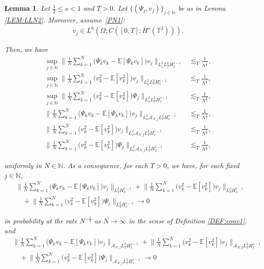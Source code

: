 \documentclass[letterpaper, 11pt,  reqno]{amsart}
\newtheorem{lemma}[theorem]{Lemma}
\newcommand{\1}{\hspace{0.5mm}\text{I}\hspace{0.2mm}}
\newcommand{\noi}{\noindent}
\newcommand{\T}{\mathbb{T}}
\newcommand{\N}{\mathbb{N}}
\newcommand{\E}{\mathbb{E}}
\newcommand{\les}{\lesssim}
\newcommand{\A}{\mathcal{A}}
\newcommand{\too}{\longrightarrow}
\renewcommand{\o}{\omega}
\numberwithin{equation}{section}
\numberwithin{theorem}{section}
\begin{document}
\begin{lemma}\label{LEM:LLN5}
Let $\frac 12  \le s < 1$
and $T > 0$.
Let  $\{(\Psi_j, v_j)\}_{j \in \N}$ be as in Lemma \ref{LEM:LLN2}.
Moreover, assume~\eqref{PN1}\textup{:} 
\begin{align}
v_j \in L^6 (\Omega; C([0, T]; H^{s} (\T^2))).
\label{PPN0x}
\end{align}


\noi
Then, 
we have
\begin{align}
\sup_{j \in \N}\bigg\| \frac{1}{N} \sum_{k = 1}^N 
\Big( \Psi_k v_k - \E [\Psi_k v_k] \Big) v_j
\bigg\|_{L^2_\o L_T^2 H^{s-1}_x} 
& \les_T \frac 1{N^\frac 12}, 
\label{PPN1} \\
\sup_{j \in \N}\bigg\| \frac{1}{N} \sum_{k = 1}^N
\Big( v_k^2 - \E [v_k^2] \Big) v_j
\bigg\|_{L^2_\o L_T^2 H^{s-1}_x} &\les_T \frac 1{N^\frac 12}, 
\label{PPN2} \\
\sup_{j \in \N} \bigg\| \frac{1}{N} \sum_{k = 1}^N
\Big( v_k^2 - \E [v_k^2] \Big) \Psi_j
\bigg\|_{L^2_\o L_T^2 H^{s-1}_x} & 
\les_T \frac 1{N^\frac 12}, 
\label{PPN2a} \\
\bigg\| \frac{1}{N} \sum_{k = 1}^N 
\Big( \Psi_k v_k - \E [\Psi_k v_k] \Big) v_j
\bigg\|_{L^2_\o \A_{N, j} L_T^2 H^{s-1}_x} & \les_T \frac 1{N^\frac 12}, 
\label{PPN3} \\
 \bigg\| \frac{1}{N} \sum_{k = 1}^N
\Big( v_k^2 - \E [v_k^2] \Big) v_j
\bigg\|_{L^2_\o \A_{N, j}L_T^2 H^{s-1}_x} & \les_T \frac 1{N^\frac 12}, 
\label{PPN4} \\
\bigg\| \frac{1}{N} \sum_{k = 1}^N
\Big( v_k^2 - \E [v_k^2] \Big) \Psi_j
\bigg\|_{L^2_\o \A_{N, j}L_T^2 H^{s-1}_x} & \les_T \frac 1{N^\frac 12}, 
\label{PPN4a} 
\end{align}

\noi
uniformly in  $N \in \N$.
As a consequence,
for each $T > 0$, we have, 
for each fixed $j \in \N$, 
\begin{align*}
& \bigg\| \frac{1}{N} \sum_{k = 1}^N 
\Big( \Psi_k v_k - \E [\Psi_k v_k] \Big) v_j
\bigg\|_{ L_T^2 H^{s-1}_x} 
+ \bigg\| \frac{1}{N} \sum_{k = 1}^N
\Big( v_k^2 - \E [v_k^2] \Big) v_j
\bigg\|_{ L_T^2 H^{s-1}_x}\\
& 
\quad +   \bigg\| \frac{1}{N} \sum_{k = 1}^N
\Big( v_k^2 - \E [v_k^2] \Big) \Psi_j
\bigg\|_{L_T^2 H^{s-1}_x}
\too 0
\end{align*}

\noi
in probability
at the rate $N^{-\frac 12 }$
as $N \to \infty$
in the sense of Definition \ref{DEF:conv1}, 
and 
\begin{align*}
& \bigg\| \frac{1}{N} \sum_{k = 1}^N 
\Big( \Psi_k v_k - \E [\Psi_k v_k] \Big) v_j
\bigg\|_{ \A_{N, j} L_T^2 H^{s-1}_x} 
+ 
 \bigg\| \frac{1}{N} \sum_{k = 1}^N
\Big( v_k^2 - \E [v_k^2] \Big) v_j
\bigg\|_{ \A_{N, j}L_T^2 H^{s-1}_x} \\
& \quad
+ 
\bigg\| \frac{1}{N} \sum_{k = 1}^N
\Big( v_k^2 - \E [v_k^2] \Big) \Psi_j
\bigg\|_{ \A_{N, j}L_T^2 H^{s-1}_x} \too0
\end{align*}






\end{lemma}
\end{document}
